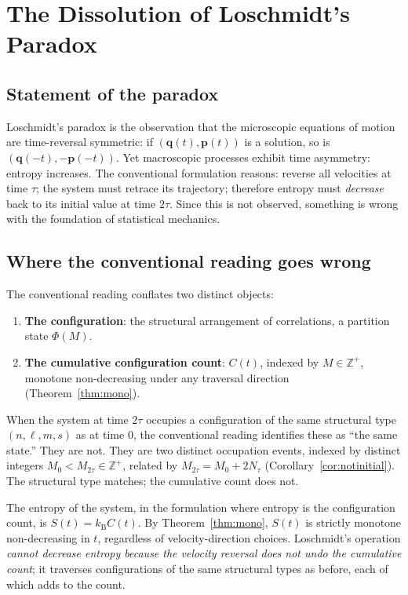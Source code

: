 \documentclass[twocolumn,10pt,a4paper]{article}
\theoremstyle{thmstyle}
\theoremstyle{definition}
\theoremstyle{remark}
\newcommand{\Zp}{\mathbb{Z}^{+}}
\newcommand{\PhiMap}{\varPhi}
\newcommand{\kB}{k_{\mathrm{B}}}
\begin{document}
\section{The Dissolution of Loschmidt's Paradox}
\label{sec:dissolution}

\subsection{Statement of the paradox}

Loschmidt's paradox is the observation that the microscopic equations
of motion are time-reversal symmetric: if $(\mathbf{q}(t),\mathbf{p}(t))$
is a solution, so is $(\mathbf{q}(-t),-\mathbf{p}(-t))$. Yet macroscopic
processes exhibit time asymmetry: entropy increases. The conventional
formulation reasons: reverse all velocities at time $\tau$; the system
must retrace its trajectory; therefore entropy must \emph{decrease}
back to its initial value at time $2\tau$. Since this is not observed,
something is wrong with the foundation of statistical mechanics.

\subsection{Where the conventional reading goes wrong}

The conventional reading conflates two distinct objects:

\begin{enumerate}[nosep,leftmargin=*]
\item \textbf{The configuration}: the structural arrangement of
correlations, a partition state $\PhiMap(M)$.
\item \textbf{The cumulative configuration count}: $C(t)$, indexed by
$M\in\Zp$, monotone non-decreasing under any traversal direction
(Theorem~\ref{thm:mono}).
\end{enumerate}

When the system at time $2\tau$ occupies a configuration of the same
structural type $(n,\ell,m,s)$ as at time $0$, the conventional reading
identifies these as ``the same state.'' They are not. They are two
distinct occupation events, indexed by distinct integers
$M_{0}<M_{2\tau}\in\Zp$, related by $M_{2\tau}=M_{0}+2N_{\tau}$
(Corollary~\ref{cor:notinitial}). The structural type matches; the
cumulative count does not.

The entropy of the system, in the formulation where entropy is the
configuration count, is $S(t)=\kB C(t)$. By
Theorem~\ref{thm:mono}, $S(t)$ is strictly monotone non-decreasing
in $t$, regardless of velocity-direction choices. Loschmidt's
operation \emph{cannot decrease entropy because the velocity reversal
does not undo the cumulative count}; it traverses configurations of
the same structural types as before, each of which adds to the count.
\end{document}
